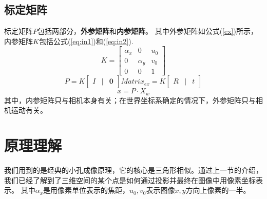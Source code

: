 \documentclass[UTF8]{ctexart}
\begin{document}
\begin{CJK*}{UTF8}{gbsn}
\subsection{标定矩阵}
标定矩阵$P$包括两部分，\textbf{外参矩阵}和\textbf{内参矩阵}。
其中外参矩阵如公式(\ref{ex})所示，内参矩阵$K$包括公式(\ref{eq:in1})和(\ref{eq:in2}).
\begin{equation}
\label{ww}
K = \begin{bmatrix}
\alpha_x & 0 & u_0 \\
0 & \alpha_y & v_0 \\
0 & 0 & 1
\end{bmatrix}
\end{equation}
\begin{equation}
P = K \begin{bmatrix}  I & | & \mathbf{0}\end{bmatrix} Matrix_{ex} = K \begin{bmatrix}  R&|&t\end{bmatrix}
\end{equation}
\begin{equation}
x = P \cdot X_w
\end{equation}
其中，内参矩阵只与相机本身有关；在世界坐标系确定的情况下，外参矩阵只与相机运动有关。
\section{原理理解}

我们用到的是经典的小孔成像原理，它的核心是三角形相似。通过上一节的介绍，我们已经了解到了三维空间的某个点是如何通过投影并最终在图像中用像素坐标表示。
其中$\alpha_x$是用像素单位表示的焦距，$u_0, v_0$表示图像$x, y$方向上像素的一半。

\end{CJK*}
\end{document}
